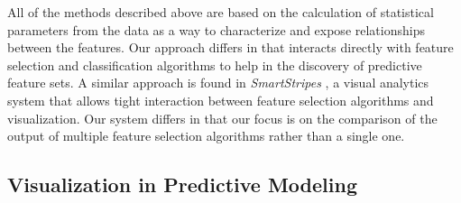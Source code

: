 All of the methods described above are based on the calculation
of statistical parameters from the data as a way to characterize
and expose relationships between the features.
Our approach differs in that \infuse interacts directly
with feature selection and classification algorithms to help in
the discovery of predictive feature sets.
A similar approach is found in \textit{SmartStripes} \cite{May2011},
a visual analytics system that allows tight interaction between feature selection algorithms and visualization. Our system differs in that our focus is on the comparison of the output of multiple feature selection algorithms rather than a single one.





\subsection{Visualization in Predictive Modeling}


